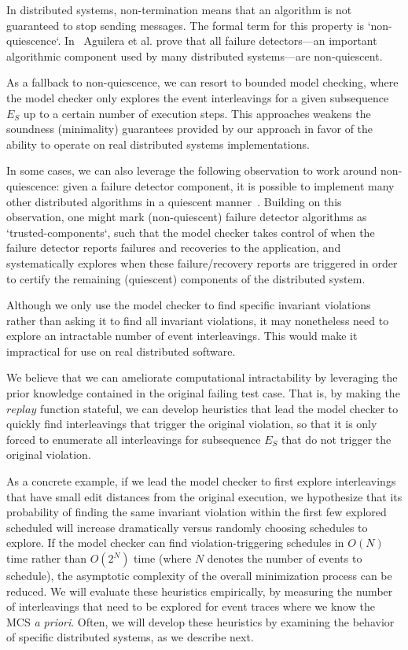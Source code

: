 In distributed systems, non-termination means that an algorithm is not guaranteed to stop
sending messages. The formal term for this property is `non-quiescence`. In~\cite{aguilera1997heartbeat} Aguilera et al. prove that
all failure detectors---an important algorithmic component used by many distributed systems---are
non-quiescent.

As a fallback to non-quiescence, we can resort to
bounded model checking, where the model checker only explores the event
interleavings for a given subsequence $E_S$ up to a certain number of
execution steps. This approaches weakens the soundness (minimality) guarantees provided by
our approach in favor of the ability to operate on real distributed
systems implementations.

In some cases, we can also leverage the following observation to work around
non-quiescence:
given a failure detector component, it is possible to implement many other
distributed algorithms in a quiescent manner~\cite{aguilera1997heartbeat}. Building on this observation,
one might mark (non-quiescent) failure detector algorithms as `trusted-components`,
such that the model checker takes control of when the failure detector reports
failures and recoveries to the application, and systematically explores when
these failure/recovery reports are triggered in order to certify the remaining
(quiescent) components of the distributed system.

 Although we only use the
model checker to find specific invariant violations rather than asking it to
find all invariant violations, it may nonetheless need to explore an
intractable number of event interleavings. This would make it impractical for
use on real distributed software.

We believe that we can ameliorate computational intractability by
leveraging the prior knowledge contained in the original failing test case.
That is, by making the $replay$ function stateful, we can develop heuristics that lead the
model checker to quickly find interleavings that trigger the original violation, so that
it is only forced to enumerate all interleavings for subsequence $E_S$ that do
not trigger the original violation.

As a concrete example, if we lead
the model checker to first explore interleavings that have small edit
distances from the original execution, we hypothesize that its probability of
finding the same invariant violation within the first few explored scheduled
will increase dramatically versus randomly choosing schedules to explore.
If the model checker can find violation-triggering schedules in $O(N)$ time rather than $O(2^N)$ time
(where $N$ denotes the number of events to schedule),
the asymptotic complexity of the overall minimization process can be reduced.
We will evaluate these heuristics empirically, by measuring the number of
interleavings that need to be explored for event traces where we know the
MCS {\em a priori}. Often, we will develop these heuristics by examining the
behavior of specific distributed systems, as we describe next.

